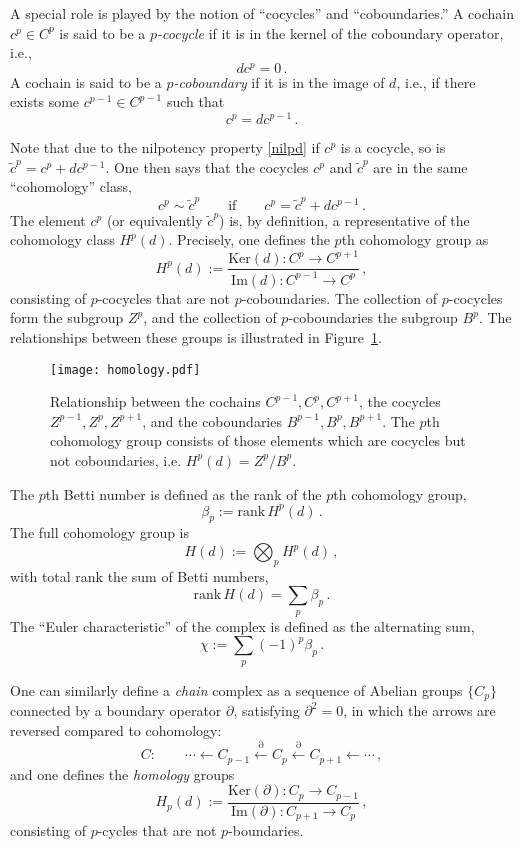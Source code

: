 \documentclass[11pt]{article}
\numberwithin{equation}{section}
\newcommand\equ[1] {\begin{equation}#1\end{equation}}
\renewcommand\( {\left(}
\renewcommand\) {\right)}
\begin{document}
A special role is played by the notion of ``cocycles'' and ``coboundaries.'' A cochain $c^p\in C^p$ is said to be a {\it $p$-cocycle} if it is in the kernel of the coboundary operator, i.e.,
\equ{
dc^p=0\,.
}
A cochain is said to be a {\it $p$-coboundary} if it is in the image of $d$, i.e., if there exists some $c^{p-1} \in C^{p-1}$ such that
\equ{
c^p=dc^{p-1}\,.
}

Note that due to the nilpotency property \eqref{nilpd} if $c^p$ is a cocycle,  so is $\tilde c^p=c^p+dc^{p-1}$. One then says that the cocycles $c^p$ and $\tilde c^p$ are in the same ``cohomology'' class,
\equ{
c^p\sim \tilde c^p\qquad \text{if}\qquad c^p=\tilde c^p+dc^{p-1}\,.
}
The element $c^p$ (or equivalently $\tilde c^p$) is, by definition, a representative of the cohomology class $H^p(d)$. Precisely, one defines the $p$th cohomology group  as
\equ{
H^{p}(d):= \frac{\text{Ker}(d): C^{p}\to C^{p+1}}{\text{Im} (d): C^{p-1}\to C^{p}}\,,
}
consisting of  $p$-cocycles that are not $p$-coboundaries. The collection of $p$-cocycles form the subgroup $Z^p$, and the collection of $p$-coboundaries the subgroup $B^p$. The relationships between these groups is illustrated in Figure~\ref{fig:cohomology}.

\begin{figure}
    \centering
    \texttt{[image: homology.pdf]}
    \caption{Relationship between the cochains $C^{p-1}, C^p, C^{p+1}$, the cocycles $Z^{p-1}, Z^p, Z^{p+1}$, and the coboundaries $B^{p-1},B^p,B^{p+1}$. The $p$th cohomology group consists of those elements which are cocycles but not coboundaries, i.e. $H^p(d) = Z^p/B^p$.}
    \label{fig:cohomology}
\end{figure}

The $p$th Betti number is defined as the rank of the $p$th cohomology group,
\equ{
\beta_{p}:=\text{rank}\, H^{p}(d)\,.
}
The full cohomology group is  
\equ{
H(d):= \bigotimes_{p}  H^p(d)\,,
}
with total rank the  sum of Betti numbers,
\equ{
\text{rank}\, H(d) = \sum_p \beta_p\,.
}
The ``Euler characteristic'' of the complex is defined  as the alternating sum, 
\equ{
\chi:=\sum_p (-1)^p\beta_p\,.
}

One can similarly define a \emph{chain} complex as a sequence of Abelian groups $\{C_p\}$ connected by a boundary operator $\partial$, satisfying $\partial^2=0$, in which the arrows are reversed compared to cohomology:
\equ{
C: \qquad \cdots  \leftarrow  C_{p-1}\xleftarrow{\partial}C_{p}\xleftarrow{\partial} C_{p+1} \leftarrow \cdots  \,,
}
and one defines the {\it homology} groups
\equ{
H_{p}(d):= \frac{\text{Ker}(\partial): C_{p}\to C_{p-1}}{\text{Im} (\partial): C_{p+1}\to C_{p}}\,,
}
consisting of $p$-cycles that are not $p$-boundaries.
\end{document}
